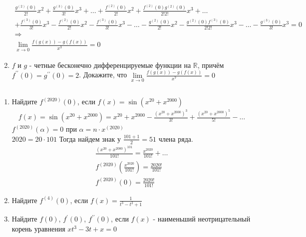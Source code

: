 \begin{enumerate}
\begin{gather*}
				\frac{g^{(2)}(0)}{2!}x^{2} + \frac{g^{(3)}(0)}{3!}x^{3} + \ldots + \frac{f^{(2)}(0)}{2!}x^{2} + \frac{f^{(2)}(0) g^{(2)}(0)}{2!2!}x^{3} + \ldots\\ + \frac{f^{(3)}(0)}{3!}x^{3} - \frac{f^{(2)}(0)}{2!}x^{2} - \frac{f^{(3)}(0)}{3!}x^{3} - \ldots - \frac{g^{(2)}(0)}{2!}x^{2} - \frac{g^{(2)}(0)f^{(3)}(0)}{2!2!}x^{3} - \ldots - \frac{g^{(3)}(0)}{3!}x^{3} = 0\\
				\Rightarrow\\
				\lim\limits_{x \to 0} \frac{f(g(x)) - g(f(x))}{x^3} = 0
			\end{gather*}
		\item $f$ и $g$ - четные бесконечно дифференцируемые функции на $\mathbb{R}$, причём $f^{\prime \prime}(0) = g^{\prime \prime}(0) = 2$. Докажите, что $\lim\limits_{x\to 0}\frac{f(g(x)) - g(f(x))}{x^7} = 0$
		\end{enumerate}
		
		
		\subsection{}
		\begin{enumerate}
		\item Найдите $f^{(2020)} (0)$, если $f(x) = \sin(x^{20} + x^{2000})$
			\begin{gather*}
				f(x) = \sin(x^{20} + x^{2000}) = x^{20} + x^{2000} - \frac{(x^{20} + x^{2000})^3}{3!} + \frac{(x^{20} + x^{2000})^5}{5!} - \ldots
			\end{gather*}
			$f^{(2020)}(\alpha) = 0$ при $\alpha = n \cdot x^{(2020)}$\\
			$2020 = 20 \cdot 101$ Тогда найдем знак у $\frac{101 + 1}{2} = 51$ члена ряда.
			\begin{gather*}
				\frac{(x^{20} + x^{2000})^{101}}{101!} = \frac{x^{2020}}{101!} + \ldots\\
				f^{(2020)}(\frac{x^{2020}}{101!}) = \frac{2020!}{101!}\\
				f^{(2020)}(0) = \frac{2020!}{101!}
			\end{gather*}
		\item Найдите $f^{(4)} (0)$, если $f(x) = \frac{1}{t^3 - t^2 + 1}$
		\item Найдите $f(0)$, $f^{\prime}(0)$, $f^{\prime \prime}(0)$, если $f(x)$ - наименьший неотрицательный корень уравнения $xt^3 - 3t + x = 0$
		\end{enumerate}
			
